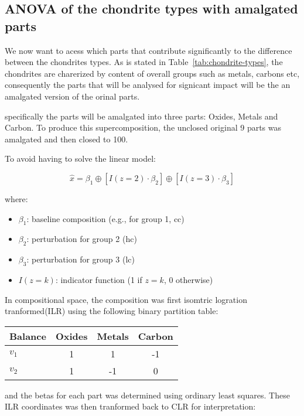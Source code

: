 




\subsection{ANOVA of the chondrite types with amalgated parts}


We now want to acess which parts that contribute significantly to the difference between the chondrites types. As is stated in Table~\ref{tab:chondrite-types}, the chondrites are charerized by content of overall groups such as metals, carbons etc, consequently the parts that will be analysed for signicant impact will be the an amalgated version of the orinal parts. 

specifically the parts will be amalgated into three parts: Oxides, Metals and Carbon. To produce this supercomposition, the unclosed original 9 parts was amalgated and then closed to 100. 


To avoid having to solve the linear model: 

$$
\hat{x} = \beta_1 \oplus \left[ I(z = 2) \cdot \beta_2 \right] \oplus \left[ I(z = 3) \cdot \beta_3 \right]
$$

\noindent where:
\begin{itemize}
    \item \( \beta_1 \): baseline composition (e.g., for group 1, cc)
    \item \( \beta_2 \): perturbation for group 2 (hc)
    \item \( \beta_3 \): perturbation for group 3 (lc)
    \item \( I(z = k) \): indicator function (1 if \( z = k \), 0 otherwise)
\end{itemize}

In compositional space, the composition was first isomtric logration tranformed(ILR) using the following binary partition table:

\begin{table}[h!]
\centering
\begin{tabular}{lccc}
\textbf{Balance} & Oxides & Metals & Carbon \\
\midrule
$v_1$  & 1  & 1  & -1 \\
$v_2$  & 1  & -1 & 0  \\
\end{tabular}
\end{table}

and the betas for each part was determined using ordinary least squares. These ILR coordinates was then tranformed back to CLR for interpretation:


